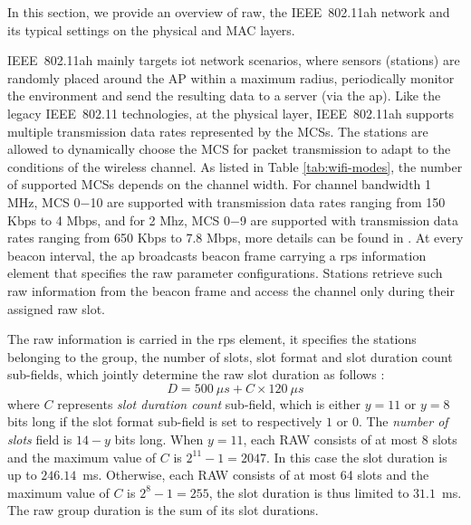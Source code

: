 In this section, we provide an overview of \gls{raw}, the IEEE~802.11ah network and its typical settings on the physical and MAC layers. 



IEEE~802.11ah mainly targets \gls{iot} network scenarios, where sensors (stations) are randomly placed around the AP within a maximum radius, periodically monitor the environment and send the resulting data to a server (via the \gls{ap}). Like the legacy IEEE~802.11 technologies, at the physical layer, IEEE~802.11ah supports multiple transmission data rates represented by the MCSs. The stations are allowed to dynamically choose the MCS for packet transmission to adapt to the conditions of the wireless channel. As listed in Table \ref{tab:wifi-modes}, the number of supported MCSs depends on the channel width. For channel bandwidth 1 MHz,  MCS 0$-$10 are supported with transmission data rates ranging from 150 Kbps to 4 Mbps, and for 2 Mhz, MCS 0$-$9 are supported with transmission data rates ranging from 650 Kbps to 7.8 Mbps, more details can be found in \cite{80211ahStd}. At every beacon interval, the \gls{ap} broadcasts beacon frame carrying a \gls{rps} information element that specifies the \gls{raw} parameter configurations. Stations retrieve such \gls{raw} information from the beacon frame and access the channel only during their assigned \gls{raw} slot. 


The \gls{raw} information is carried in the \gls{rps} element, it specifies the stations belonging to the group, the number of slots, slot format and slot duration count sub-fields, which jointly determine the \gls{raw} slot duration as follows \cite{80211ahStd}: 
\begin{equation} \label{eq:Duration}
D = 500~\mu{}s + C \times 120~\mu{}s  
\end{equation}
where $C$ represents \textit{slot duration count} sub-field, which is either $y = 11$ or $y = 8$ bits long if the slot format sub-field is set to respectively $1$ or $0$. The \textit{number of slots} field is $14-y$ bits long. When $y = 11$, each RAW consists of at most 8 slots and the maximum value of $C$ is $2^{11}-1=2047$. In this case the slot duration is up to $246.14$~ms. Otherwise, each RAW consists of at most 64 slots and the maximum value of $C$ is $2^{8}-1=255$, the slot duration is thus limited to $31.1$~ms. The \gls{raw} group duration is the sum of its slot durations.



